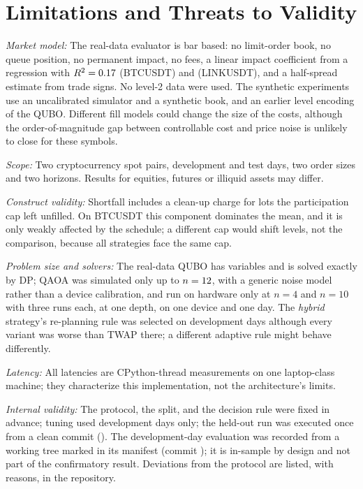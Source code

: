 \documentclass[journal]{IEEEtran}
\begin{document}
\section{Limitations and Threats to Validity}
\label{sec:limitations}

\emph{Market model:} The real-data evaluator is bar based: no limit-order book, no queue
position, no permanent impact, no fees, a linear impact coefficient from a regression with
$R^2=0.17$ (BTCUSDT) and \LinkBetaRsq{} (LINKUSDT), and a half-spread estimate from
trade signs. No level-2 data were used. The synthetic experiments use an uncalibrated
simulator and a synthetic book, and an earlier level encoding of the QUBO. Different fill
models could change the size of the costs, although the order-of-magnitude gap between
controllable cost and price noise is unlikely to close for these symbols.

\emph{Scope:} Two cryptocurrency spot pairs, \NumDevDays{} development and \NumTestDays{} test days,
two order sizes and two horizons. Results for equities, futures or illiquid assets may
differ.

\emph{Construct validity:} Shortfall includes a clean-up charge for lots the participation
cap left unfilled. On BTCUSDT this component dominates the mean, and it is only weakly
affected by the schedule; a different cap would shift levels, not the comparison, because
all strategies face the same cap.

\emph{Problem size and solvers:} The real-data QUBO has \TuneVariables{} variables and is
solved exactly by DP; QAOA was simulated only up to $n=12$, with a generic noise
model rather than a device calibration, and run on hardware only at $n=4$ and $n=10$ with
three runs each, at one depth, on one device and one day. The \emph{hybrid} strategy's
re-planning rule was selected on development days although every variant was worse than
TWAP there; a different adaptive rule might behave differently.

\emph{Latency:} All latencies are CPython-thread measurements on one laptop-class machine;
they characterize this implementation, not the architecture's limits.

\emph{Internal validity:} The protocol, the split, and the decision rule were fixed in
advance; tuning used development days only; the held-out run was executed once from a clean
commit (\texttt{\TestCommit}). The development-day evaluation was recorded from a working
tree marked \emph{\DevCommitClean} in its manifest (commit \texttt{\DevCommit}); it is
in-sample by design and not part of the confirmatory result. Deviations from the protocol
are listed, with reasons, in the repository.
\end{document}
